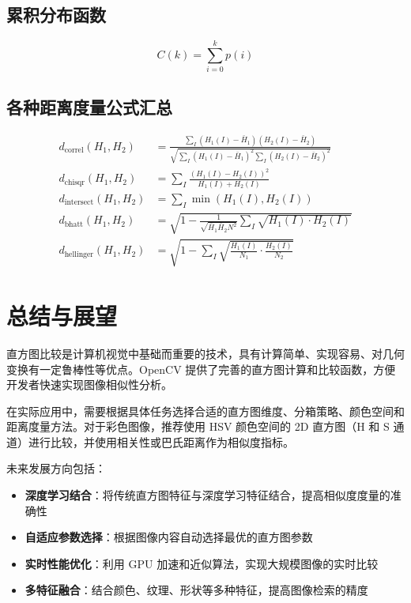 \documentclass{article}
\begin{document}
\subsection{累积分布函数}
\[
C(k) = \sum_{i=0}^{k} p(i)
\]

\subsection{各种距离度量公式汇总}
\begin{align}
d_{\text{correl}}(H_1,H_2) &= \frac{\sum_I (H_1(I) - \bar{H}_1)(H_2(I) - \bar{H}_2)}{\sqrt{\sum_I (H_1(I) - \bar{H}_1)^2 \sum_I (H_2(I) - \bar{H}_2)^2}} \\
d_{\text{chisqr}}(H_1,H_2) &= \sum_I \frac{(H_1(I) - H_2(I))^2}{H_1(I) + H_2(I)} \\
d_{\text{intersect}}(H_1,H_2) &= \sum_I \min(H_1(I), H_2(I)) \\
d_{\text{bhatt}}(H_1,H_2) &= \sqrt{1 - \frac{1}{\sqrt{\bar{H}_1 \bar{H}_2 N^2}} \sum_I \sqrt{H_1(I) \cdot H_2(I)}} \\
d_{\text{hellinger}}(H_1,H_2) &= \sqrt{1 - \sum_I \sqrt{\frac{H_1(I)}{N_1} \cdot \frac{H_2(I)}{N_2}}}
\end{align}

\section{总结与展望}

直方图比较是计算机视觉中基础而重要的技术，具有计算简单、实现容易、对几何变换有一定鲁棒性等优点。OpenCV 提供了完善的直方图计算和比较函数，方便开发者快速实现图像相似性分析。

在实际应用中，需要根据具体任务选择合适的直方图维度、分箱策略、颜色空间和距离度量方法。对于彩色图像，推荐使用 HSV 颜色空间的 2D 直方图（H 和 S 通道）进行比\noindent 较，并使用相关性或巴氏距离作为相似度指标。

未来发展方向包括：
\begin{itemize}
    \item \textbf{深度学习结合}：将传统直方图特征与深度学习特征结合，提高相似度度量的准确性
    \item \textbf{自适应参数选择}：根据图像内容自动选择最优的直方图参数
    \item \textbf{实时性能优化}：利用 GPU 加速和近似算法，实现大规模图像的实时比较
    \item \textbf{多特征融合}：结合颜色、纹理、形状等多种特征，提高图像检索的精度
\end{itemize}
\end{document}
